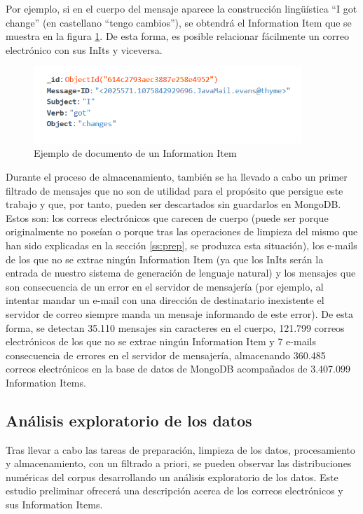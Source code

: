 Por ejemplo, si en el cuerpo del mensaje aparece la construcción lingüística ``I got change'' (en castellano ``tengo cambios''), se obtendrá el Information Item que se muestra en la figura \ref{fig:initexample}. De esta forma, es posible relacionar fácilmente un correo electrónico con sus InIts y viceversa.

\begin{figure}[h]
	\centering%
	\centerline{\includegraphics[width = 0.9\textwidth]{Imagenes/Bitmap/initexample.png}}%
	\caption{Ejemplo de documento de un Information Item}%
	\label{fig:initexample}
\end{figure}

Durante el proceso de almacenamiento, también se ha llevado a cabo un primer filtrado de mensajes que no son de utilidad para el propósito que persigue este trabajo y que, por tanto, pueden ser descartados sin guardarlos en MongoDB. Estos son: los correos electrónicos que carecen de cuerpo (puede ser porque originalmente no poseían o porque tras las operaciones de limpieza del mismo que han sido explicadas en la sección \ref{ss:prep}, se produzca esta situación), los e-mails de los que no se extrae ningún Information Item (ya que los InIts serán la entrada de nuestro sistema de generación de lenguaje natural) y los mensajes que son consecuencia de un error en el servidor de mensajería (por ejemplo, al intentar mandar un e-mail con una dirección de destinatario inexistente el servidor de correo siempre manda un mensaje informando de este error). De esta forma, se detectan 35.110 mensajes sin caracteres en el cuerpo, 121.799 correos electrónicos de los que no se extrae ningún Information Item y 7 e-mails consecuencia de errores en el servidor de mensajería, almacenando 360.485 correos electrónicos en la base de datos de MongoDB acompañados de 3.407.099 Information Items.

\subsection{Análisis exploratorio de los datos}\label{ss:eda}
Tras llevar a cabo las tareas de preparación, limpieza de los datos, procesamiento y almacenamiento, con un filtrado a priori, se pueden observar las distribuciones numéricas del corpus desarrollando un análisis exploratorio de los datos. Este estudio preliminar ofrecerá una descripción acerca de los correos electrónicos y sus Information Items.

